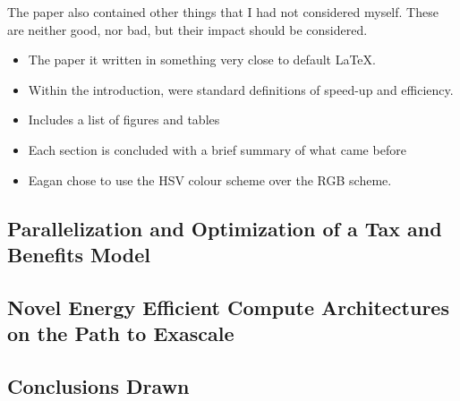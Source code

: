   The paper also contained other things that I had not considered myself.
  These are neither good, nor bad, but their impact should be considered.
  \begin{itemize}
    \item The paper it written in something very close to default \LaTeX.
    \item Within the introduction, were standard definitions of speed-up and efficiency.
    \item Includes a list of figures and tables
    \item Each section is concluded with a brief summary of what came before
    \item Eagan chose to use the HSV colour scheme over the RGB scheme.
  \end{itemize}
\subsection{Parallelization and Optimization of a Tax and Benefits Model}
\subsection{Novel Energy Efficient Compute Architectures on the Path to Exascale}
\subsection{Conclusions Drawn}
